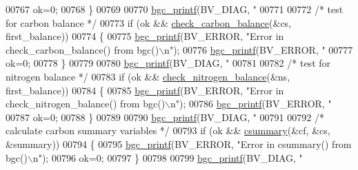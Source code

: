 \begin{DoxyCode}
{{{{{{{{{{{{{{{{{{{{{{{{{{{{00767                 ok=0;
00768             \}
00769             
00770             \hyperlink{bgc__io_8c_af287cce6e2aede1ce337de9319e80d0d}{bgc\_printf}(BV\_DIAG, \textcolor{stringliteral}{"%
00771 
00772             \textcolor{comment}{/* test for carbon balance */}
00773             \textcolor{keywordflow}{if} (ok && \hyperlink{check__balance_8c_adf0fd12860935512d2a5f628e87c1171}{check\_carbon\_balance}(&cs, first\_balance))
00774             \{
00775                 \hyperlink{bgc__io_8c_af287cce6e2aede1ce337de9319e80d0d}{bgc\_printf}(BV\_ERROR, \textcolor{stringliteral}{"Error in check\_carbon\_balance() from bgc()\(\backslash\)n"});
00776                 \hyperlink{bgc__io_8c_af287cce6e2aede1ce337de9319e80d0d}{bgc\_printf}(BV\_ERROR, \textcolor{stringliteral}{"%
00777                 ok=0;
00778             \}
00779             
00780             \hyperlink{bgc__io_8c_af287cce6e2aede1ce337de9319e80d0d}{bgc\_printf}(BV\_DIAG, \textcolor{stringliteral}{"%
00781 
00782             \textcolor{comment}{/* test for nitrogen balance */}
00783             \textcolor{keywordflow}{if} (ok && \hyperlink{check__balance_8c_a72e7148d8dcce5a86380cf56d81f0955}{check\_nitrogen\_balance}(&ns, first\_balance))
00784             \{
00785                 \hyperlink{bgc__io_8c_af287cce6e2aede1ce337de9319e80d0d}{bgc\_printf}(BV\_ERROR, \textcolor{stringliteral}{"Error in check\_nitrogen\_balance() from bgc()\(\backslash\)n"});
00786                 \hyperlink{bgc__io_8c_af287cce6e2aede1ce337de9319e80d0d}{bgc\_printf}(BV\_ERROR, \textcolor{stringliteral}{"%
00787                 ok=0;
00788             \}
00789             
00790             \hyperlink{bgc__io_8c_af287cce6e2aede1ce337de9319e80d0d}{bgc\_printf}(BV\_DIAG, \textcolor{stringliteral}{"%
00791 
00792             \textcolor{comment}{/* calculate carbon summary variables */}
00793             \textcolor{keywordflow}{if} (ok && \hyperlink{summary_8c_a063a448b14734e59d301b2639c5b107a}{csummary}(&cf, &cs, &summary))
00794             \{
00795                 \hyperlink{bgc__io_8c_af287cce6e2aede1ce337de9319e80d0d}{bgc\_printf}(BV\_ERROR, \textcolor{stringliteral}{"Error in csummary() from bgc()\(\backslash\)n"});
00796                 ok=0;
00797             \} 
00798             
00799             \hyperlink{bgc__io_8c_af287cce6e2aede1ce337de9319e80d0d}{bgc\_printf}(BV\_DIAG, \textcolor{stringliteral}{"%
}}}}}}}}}}}}}}}}}}}}}}}}}}}}}}}}}}
\end{DoxyCode}
